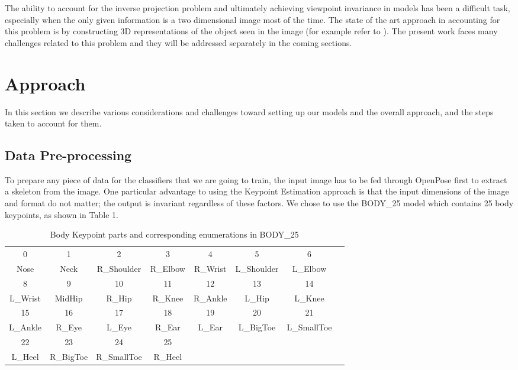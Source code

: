 \documentclass{article}
\begin{document}
The ability to account for the inverse projection problem and ultimately achieving viewpoint invariance in models has been a difficult task, especially when the only given information is a two dimensional image most of the time. The state of the art approach in accounting for this problem is by constructing 3D representations of the object seen in the image (for example refer to \citep{shin2018pixels} ). The present work faces many challenges related to this problem and they will be addressed separately in the coming sections.

\section{Approach}

In this section we describe various considerations and challenges toward setting up our models and the overall approach, and the steps taken to account for them.

\subsection{Data Pre-processing}

To prepare any piece of data for the classifiers that we are going to train, the input image has to be fed through OpenPose first to extract a skeleton from the image. One particular advantage to using the Keypoint Estimation approach is that the input dimensions of the image and format do not matter; the output is invariant regardless of these factors. We chose to use the BODY\_25 model which contains 25 body keypoints, as shown in Table 1.

\begin{table}[h]
	\caption{Body Keypoint parts and corresponding enumerations in BODY\_25}
	\centering
	\begin{tabular}{cccccccc}
	\toprule
	0 & 1 & 2 & 3 & 4 & 5 & 6 \\
	Nose & Neck & R\_Shoulder & R\_Elbow & R\_Wrist & L\_Shoulder & L\_Elbow\\	
	\midrule
	8 & 9 & 10 & 11 & 12 & 13 & 14\\
	L\_Wrist & MidHip & R\_Hip & R\_Knee & R\_Ankle & L\_Hip & L\_Knee\\
	\midrule
	15 & 16 & 17 & 18 & 19 & 20 & 21\\
	L\_Ankle & R\_Eye & L\_Eye & R\_Ear & L\_Ear & L\_BigToe & L\_SmallToe\\
	\midrule
	22 & 23 & 24 & 25\\
	L\_Heel &R\_BigToe & R\_SmallToe & R\_Heel\\
	\midrule
	\end{tabular}
\end{table}
\end{document}
